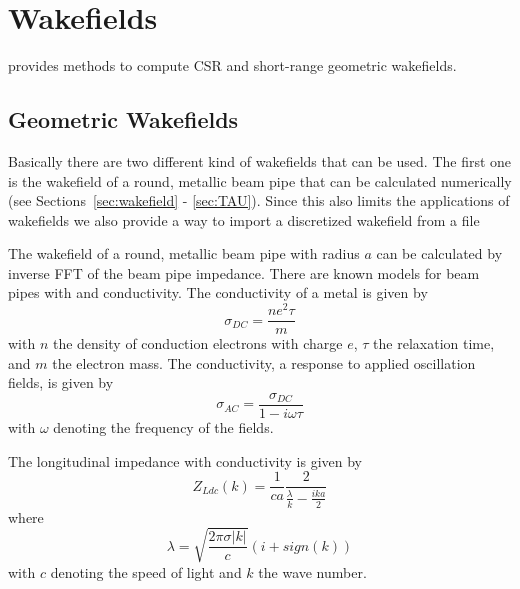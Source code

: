 

\chapter{Wakefields}
\label{chp:wakefields}

\opalt provides methods to compute CSR and short-range geometric wakefields.

\section{Geometric Wakefields}
\label{sec:wakefields:shortrange}
Basically there are two different kind of wakefields that can be used. The first one is the wakefield of a round, metallic beam pipe that can be calculated numerically (see Sections~\ref{sec:wakefield} - \ref{sec:TAU}).
Since this also limits the applications of wakefields we also provide a way to import a discretized wakefield from a file %

The wakefield of a round, metallic beam pipe with radius $a$ can be calculated by inverse FFT of the beam pipe impedance. There are known models for beam pipes with  and  conductivity. The  conductivity of a metal is given by
%
\begin{equation}
\sigma_{DC} = \frac{ne^2\tau}{m} \label{eq:dc_cond}
\end{equation}
%
with $n$ the density of conduction electrons with charge $e$, $\tau$ the relaxation time, and $m$ the electron mass. The  conductivity, a response to applied oscillation fields, is given by
%
\begin{equation}
\sigma_{AC} = \frac{\sigma_{DC}}{1-i\omega\tau} \label{eq:ac_cond}
\end{equation}
%
with $\omega$ denoting the frequency of the fields.

The longitudinal impedance with  conductivity is given by
%
\begin{equation}  \label{eq:Z[2]}
 Z_{Ldc}(k) = \dfrac{1}{ca} \dfrac{2}{\frac{\lambda}{k}-\frac{ika}{2}}
\end{equation}
%
where
\begin{equation}
\lambda=\sqrt{\dfrac{2\pi\sigma \vert k\vert}{c}}(i+sign(k))
\end{equation}
%
with $c$ denoting the speed of light and $k$ the wave number.

